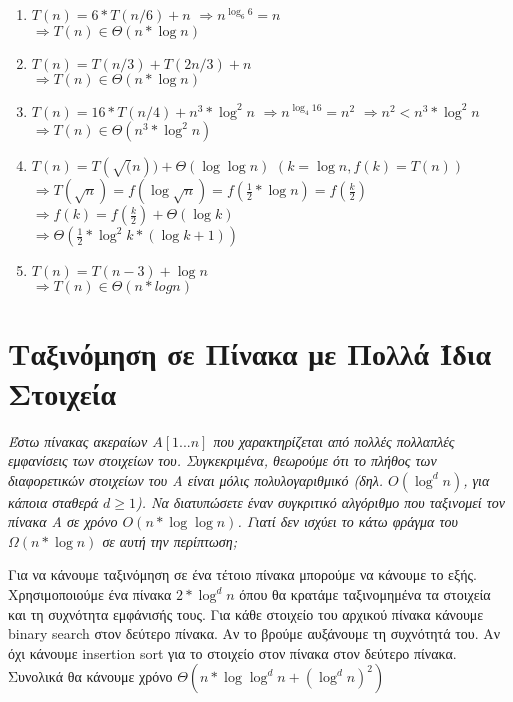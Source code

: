 \documentclass[a4paper,10pt]{article} \usepackage{anysize}
\begin{document}
\begin{enumerate}
\begin{enumerate}
\item $T(n) = 6*T(n/6)+n$
$\Rightarrow n^{\log _6 {6}} = n$\\
$\Rightarrow T(n) \in \Theta(n*\log {n})$

\item $T(n) = T(n/3) + T(2n/3) + n$\\
$\Rightarrow T(n) \in \Theta(n*\log{n})$

\item $T(n) = 16*T(n/4) + n^3*\log^2{n}$
$\Rightarrow n^{\log _4{16}} = n^2$
$\Rightarrow n^2 < n^3*\log^2{n}$\\
$\Rightarrow T(n) \in \Theta(n^3*\log^2{n})$

\item $T(n) = T(\sqrt(n)) + \Theta(\log{\log{n}})$
$(k=\log{n},f(k)=T(n))$\\
$\Rightarrow
T(\sqrt{n})=f(\log{\sqrt{n}})=f(\frac{1}{2}*\log{n})=f(\frac{k}{2}) $\\
$\Rightarrow f(k)=f(\frac{k}{2})+\Theta(\log{k})$\\
$\Rightarrow \Theta(\frac{1}{2}*\log^2{k}*(\log{k}+1))$

\item $T(n) = T(n-3) + \log{n}$\\
$\Rightarrow T(n) \in \Theta(n*logn)$

\end{enumerate}
\end{enumerate}
\pagebreak
\section{Ταξινόμηση σε Πίνακα με Πολλά Ίδια Στοιχεία}
\textit{Έστω πίνακας ακεραίων $A[1...n]$ που χαρακτηρίζεται από πολλές
πολλαπλές εμφανίσεις των στοιχείων του. Συγκεκριμένα, θεωρούμε ότι το πλήθος
των διαφορετικών στοιχείων του Α είναι μόλις πολυλογαριθμικό (δηλ.
$O(\log^d{n})$, για κάποια σταθερά $d \geq 1$). Να διατυπώσετε έναν συγκριτικό
αλγόριθμο που ταξινομεί τον πίνακα Α σε χρόνο $O(n*\log{\log{n}})$. Γιατί δεν
ισχύει το κάτω φράγμα του $\Omega({n*\log{n}})$ σε αυτή την περίπτωση;} \vspace{0.4cm}

Για να κάνουμε ταξινόμηση σε ένα τέτοιο πίνακα μπορούμε να
κάνουμε το εξής. Χρησιμοποιούμε ένα πίνακα $2*\log^d{n}$ όπου θα κρατάμε ταξινομημένα τα
στοιχεία και τη συχνότητα εμφάνισής τους. Για κάθε στοιχείο του αρχικού πίνακα
κάνουμε binary search στον δεύτερο πίνακα. Αν το βρούμε αυξάνουμε τη συχνότητά
του. Αν όχι κάνουμε insertion sort για το στοιχείο στον πίνακα στον δεύτερο
πίνακα. Συνολικά θα κάνουμε χρόνο $\Theta{(n*\log{\log^d{n}}+(\log^d{n})^2)}$
\end{document}
